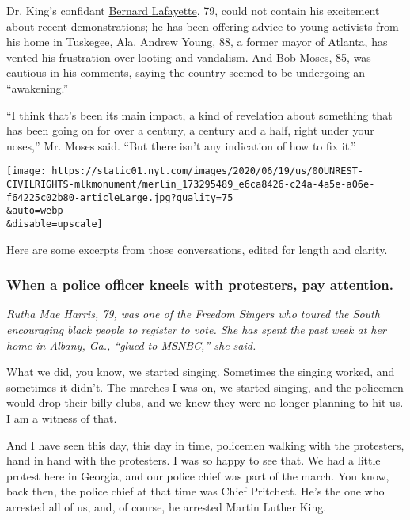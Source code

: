 Dr. King's confidant
\href{https://kinginstitute.stanford.edu/encyclopedia/lafayette-bernard}{Bernard
Lafayette}, 79, could not contain his excitement about recent
demonstrations; he has been offering advice to young activists from his
home in Tuskegee, Ala. Andrew Young, 88, a former mayor of Atlanta, has
\href{https://www.ajc.com/news/opinion/opinion-lives-must-matter-most-serious-time-for-all/7iTWmC6UxZ5s53voGaE1eO/}{vented
his frustration} over
\href{https://www.wsbtv.com/video/local-video/im-thinking-i-want-cry-andrew-young-reacts-violent-protests-atlanta/7BWDE4WNLNAVM35X5UKOCZSUQQ/}{looting
and vandalism}. And
\href{https://www.nytimes.com/2001/01/07/education/algebra-project-bob-moses-empowers-students.html?searchResultPosition=1}{Bob
Moses}, 85, was cautious in his comments, saying the country seemed to
be undergoing an ``awakening.''

``I think that's been its main impact, a kind of revelation about
something that has been going on for over a century, a century and a
half, right under your noses,'' Mr. Moses said. ``But there isn't any
indication of how to fix it.''

\texttt{[image: https://static01.nyt.com/images/2020/06/19/us/00UNREST-CIVILRIGHTS-mlkmonument/merlin\_173295489\_e6ca8426-c24a-4a5e-a06e-f64225c02b80-articleLarge.jpg?quality=75\\\&auto=webp\\\&disable=upscale]}

Here are some excerpts from those conversations, edited for length and
clarity.

\hypertarget{when-a-police-officer-kneels-with-protesters-pay-attention}{%
\subsubsection{When a police officer kneels with protesters, pay
attention.}\label{when-a-police-officer-kneels-with-protesters-pay-attention}}

\emph{Rutha Mae Harris, 79, was one of the Freedom Singers who toured
the South encouraging black people to register to vote. She has spent
the past week at her home in Albany, Ga., ``glued to MSNBC,'' she said.}

What we did, you know, we started singing. Sometimes the singing worked,
and sometimes it didn't. The marches I was on, we started singing, and
the policemen would drop their billy clubs, and we knew they were no
longer planning to hit us. I am a witness of that.

And I have seen this day, this day in time, policemen walking with the
protesters, hand in hand with the protesters. I was so happy to see
that. We had a little protest here in Georgia, and our police chief was
part of the march. You know, back then, the police chief at that time
was Chief Pritchett. He's the one who arrested all of us, and, of
course, he arrested Martin Luther King.

